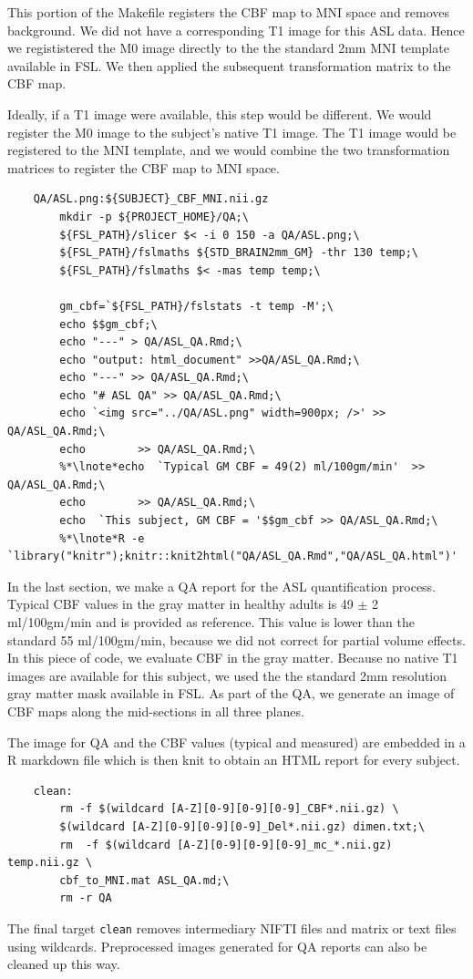 This portion of the Makefile registers the CBF map to MNI space and
removes background. We did not have a corresponding T1 image for this
ASL data. Hence we regististered the M0 image directly to the the
standard 2mm MNI template available in FSL. We then applied the
subsequent transformation matrix to the CBF map. 

Ideally, if a T1 image were available, this step would be
different. We would register the M0 image to the subject's native T1
image. The T1 image would be registered to the MNI template, and we
would combine the two transformation matrices to register the CBF map
to MNI space.

\begin{lstlisting}
	QA/ASL.png:${SUBJECT}_CBF_MNI.nii.gz
		mkdir -p ${PROJECT_HOME}/QA;\
		${FSL_PATH}/slicer $< -i 0 150 -a QA/ASL.png;\
		${FSL_PATH}/fslmaths ${STD_BRAIN2mm_GM} -thr 130 temp;\
		${FSL_PATH}/fslmaths $< -mas temp temp;\
		
		gm_cbf=`${FSL_PATH}/fslstats -t temp -M';\
		echo $$gm_cbf;\
		echo "---" > QA/ASL_QA.Rmd;\
		echo "output: html_document" >>QA/ASL_QA.Rmd;\
		echo "---" >> QA/ASL_QA.Rmd;\
		echo "# ASL QA" >> QA/ASL_QA.Rmd;\
		echo `<img src="../QA/ASL.png" width=900px; />' >> QA/ASL_QA.Rmd;\
		echo        >> QA/ASL_QA.Rmd;\
		%*\lnote*echo  `Typical GM CBF = 49(2) ml/100gm/min'  >> QA/ASL_QA.Rmd;\
		echo        >> QA/ASL_QA.Rmd;\
		echo  `This subject, GM CBF = '$$gm_cbf >> QA/ASL_QA.Rmd;\
		%*\lnote*R -e `library("knitr");knitr::knit2html("QA/ASL_QA.Rmd","QA/ASL_QA.html")'

\end{lstlisting}

In the last section, we make a QA report for the ASL quantification
process.  
\lnum{6} Typical CBF values in the gray matter in healthy
adults is 49 $\pm$ 2 ml/100gm/min and is provided as reference. This
value is lower than the standard 55 ml/100gm/min, because we did not
correct for partial volume effects. In this piece of code, we evaluate
CBF in the gray matter. Because no native T1 images are available for
this subject, we used the the standard 2mm resolution gray matter mask
available in FSL. As part of the QA, we generate an image of CBF maps
along the mid-sections in all three planes.

\lnum{7} The image for QA and the
CBF values (typical and measured) are embedded in a R markdown file
which is then knit to obtain an HTML report for every subject.

\begin{lstlisting}
	clean:
		rm -f $(wildcard [A-Z][0-9][0-9][0-9]_CBF*.nii.gz) \
		$(wildcard [A-Z][0-9][0-9][0-9]_Del*.nii.gz) dimen.txt;\
		rm  -f $(wildcard [A-Z][0-9][0-9][0-9]_mc_*.nii.gz) temp.nii.gz \
		cbf_to_MNI.mat ASL_QA.md;\
		rm -r QA

\end{lstlisting}

The final target \texttt{clean} removes intermediary NIFTI files and matrix or text files using wildcards. Preprocessed images generated for QA reports can also be cleaned up this way. 


